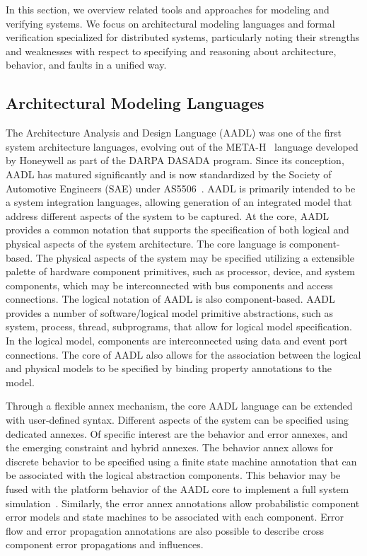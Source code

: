 
In this section, we overview related tools and approaches for modeling and verifying systems. We focus on architectural modeling languages and formal verification specialized for distributed systems, particularly noting their strengths and weaknesses with respect to specifying and reasoning about architecture, behavior, and faults in a unified way.

\subsection{Architectural Modeling Languages}\label{ssec:modeling}
The Architecture Analysis and Design Language (AADL) was one of the first system architecture languages, evolving out of the META-H~\cite{binns2001formalizing} language developed by Honeywell as part of the DARPA DASADA program. Since its conception, AADL has matured significantly and is now standardized by the Society  of Automotive Engineers (SAE) under AS5506~\cite{as5506}. AADL is primarily intended to be a system integration languages, allowing generation  of an integrated  model that address  different aspects of the system to be captured.  At the core,  AADL provides a common notation that supports the   specification of  both  logical and physical aspects  of the system architecture. The core language is component-based. The physical aspects of the system may be specified utilizing a extensible palette of hardware component primitives, such as processor, device,  and system components, which may be interconnected with bus components and access connections. 
 The logical notation of AADL is  also component-based.  AADL provides a number of software/logical model primitive abstractions, such as system, process, thread, subprograms, that allow for logical model specification. In the logical model, components are interconnected using data and event port connections. The core of AADL also allows for the association between the logical and physical models to be specified by binding property annotations to the model.

Through a flexible annex mechanism, the  core  AADL language can be extended
with user-defined syntax. Different aspects of the system can be specified using
dedicated annexes.  Of specific interest are the behavior
and error annexes, and the emerging constraint and hybrid annexes.  The behavior
annex allows for discrete behavior to be specified  using a finite state machine
annotation that can be associated with the logical abstraction components. This
behavior may be fused with the platform behavior of the AADL core to implement a
full system simulation~\cite{dissaux2014smart}.  Similarly, the error annex
annotations allow probabilistic component  error models and state machines to be
associated with each component.  Error flow and error propagation  annotations
are also possible  to describe cross component error propagations and
influences.

